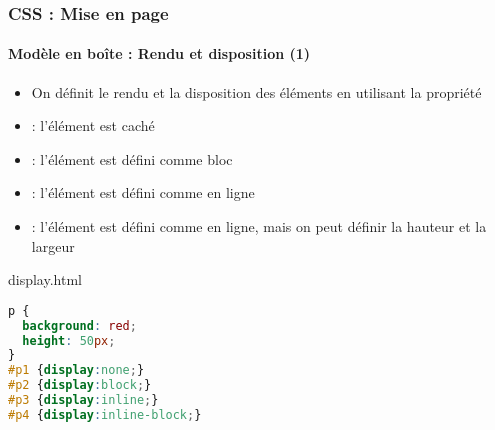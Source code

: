 \documentclass[xcolor=table]{beamer}
\begin{document}
\begin{frame}[fragile]
\frametitle{CSS : Mise en page}
\framesubtitle{Modèle en boîte : Rendu et disposition (1)}

\begin{minipage}{0.60\textwidth}
	\begin{itemize}
		\item On définit le rendu et la disposition des éléments en utilisant la propriété 
		\item {} : l'élément est caché
		\item {} : l'élément est défini comme bloc
		\item {} : l'élément est défini comme en ligne
		\item {} : l'élément est défini comme en ligne, mais on peut définir la hauteur et la largeur
	\end{itemize}
\end{minipage}
%
\begin{minipage}{0.38\textwidth}
\begin{exampleblock}{display.html}
\lstset{escapeinside=**}
\scriptsize\bfseries
\begin{lstlisting}[language={CSS}]
p {
  background: red;
  height: 50px;
}
#p1 {display:none;}
#p2 {display:block;}
#p3 {display:inline;}
#p4 {display:inline-block;}
\end{lstlisting}
\end{exampleblock}
\end{minipage}
\end{frame}
\end{document}
